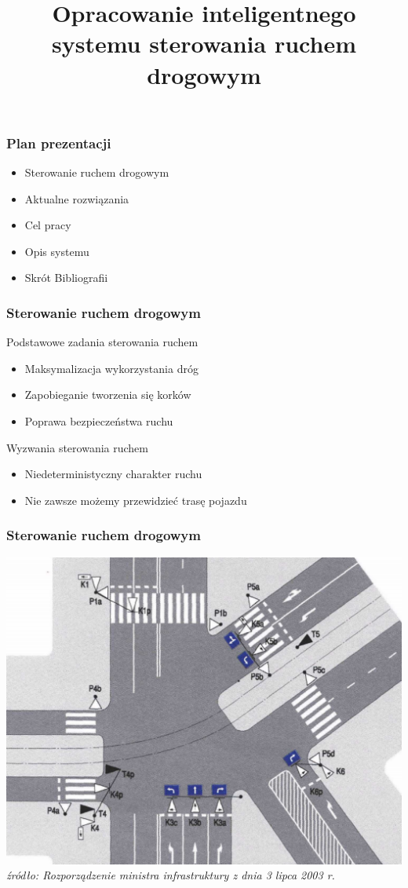 \documentclass[17pt]{beamer}
\author{}
\title{Opracowanie inteligentnego systemu sterowania ruchem drogowym}
\subtitle{}
\date{}
\institute{autor: inż. Przemysław Rokosz\\\vspace{\baselineskip}promotor: dr inż. Grzegorz Filcek}
\begin{document}
\begin{frame}[plain,t]
 \maketitle
\end{frame}

\begin{frame}[shrink=5]
 \frametitle{\vspace{22px}Plan prezentacji}
 \begin{itemize}
  \item{Sterowanie ruchem drogowym}
  \item{Aktualne rozwiązania}
  \item{Cel pracy}
  \item{Opis systemu}
  \item{Skrót Bibliografii}
 \end{itemize}
\end{frame}

\begin{frame}[shrink=5]
 \frametitle{\vspace{22px}Sterowanie ruchem drogowym}
 Podstawowe zadania sterowania ruchem
 \begin{itemize}
  \item{Maksymalizacja wykorzystania dróg}
  \item{Zapobieganie tworzenia się korków}
  \item{Poprawa bezpieczeństwa ruchu}
 \end{itemize}
 Wyzwania sterowania ruchem
 \begin{itemize}
  \item{Niedeterministyczny charakter ruchu}
  \item{Nie zawsze możemy przewidzieć trasę pojazdu}
 \end{itemize}
\end{frame}

\begin{frame}[shrink=5]
 \frametitle{\vspace{22px}Sterowanie ruchem drogowym}
 \includegraphics[scale=0.3]{schemat_1.pdf}\\
 {\tiny \textit{źródło: Rozporządzenie ministra infrastruktury z dnia 3 lipca 2003 r.}}
\end{frame}
\end{document}
